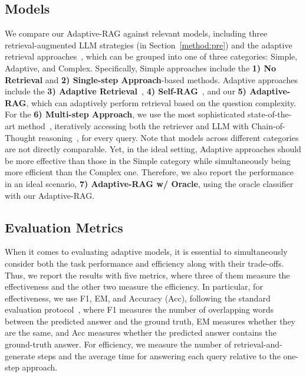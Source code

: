 \subsection{Models}
We compare our Adaptive-RAG against relevant models, including three retrieval-augmented LLM strategies (in Section~\ref{method:pre}) and the adaptive retrieval approaches~\cite{adaptiveRetrieval, self-rag}, which can be grouped into one of three categories: Simple, Adaptive, and Complex. Specifically, Simple approaches include the \textbf{1) No Retrieval} and \textbf{2) Single-step Approach}-based methods. Adaptive approaches include the \textbf{3) Adaptive Retrieval}~\cite{adaptiveRetrieval}, \textbf{4) Self-RAG}~\cite{self-rag}, and our \textbf{5) Adaptive-RAG}, which can adaptively perform retrieval based on the question complexity. For the \textbf{6) Multi-step Approach}, we use the most sophisticated state-of-the-art method~\cite{ircot}, iteratively accessing both the retriever and LLM with Chain-of-Thought reasoning~\cite{cot}, for every query. Note that models across different categories are not directly comparable. Yet, in the ideal setting, Adaptive approaches should be more effective than those in the Simple category while simultaneously being more efficient than the Complex one. Therefore, we also report the performance in an ideal scenario, \textbf{7) Adaptive-RAG w/ Oracle}, using the oracle classifier with our Adaptive-RAG.


\subsection{Evaluation Metrics}
When it comes to evaluating adaptive models, it is essential to simultaneously consider both the task performance and efficiency along with their trade-offs. Thus, we report the results with five metrics, where three of them measure the effectiveness and the other two measure the efficiency. In particular, for effectiveness, we use F1, EM, and Accuracy (Acc), following the standard evaluation protocol~\cite{adaptiveRetrieval, KALMV, self-rag}, where F1 measures the number of overlapping words between the predicted answer and the ground truth, EM measures whether they are the same, and Acc measures whether the predicted answer contains the ground-truth answer.
For efficiency, we measure the number of retrieval-and-generate steps and the average time for answering each query relative to the one-step approach.


